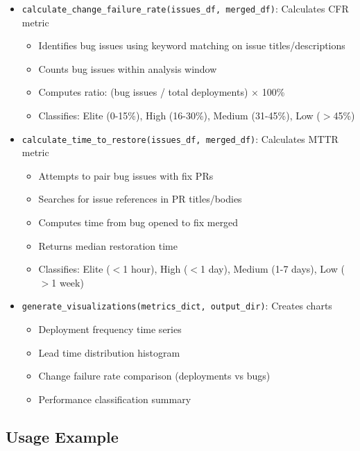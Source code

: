 \begin{itemize}
    \item \texttt{calculate\_change\_failure\_rate(issues\_df, merged\_df)}: Calculates CFR metric
    \begin{itemize}
        \item Identifies bug issues using keyword matching on issue titles/descriptions
        \item Counts bug issues within analysis window
        \item Computes ratio: (bug issues / total deployments) $\times$ 100\%
        \item Classifies: Elite (0-15\%), High (16-30\%), Medium (31-45\%), Low ($>$45\%)
    \end{itemize}

    \item \texttt{calculate\_time\_to\_restore(issues\_df, merged\_df)}: Calculates MTTR metric
    \begin{itemize}
        \item Attempts to pair bug issues with fix PRs
        \item Searches for issue references in PR titles/bodies
        \item Computes time from bug opened to fix merged
        \item Returns median restoration time
        \item Classifies: Elite ($<$1 hour), High ($<$1 day), Medium (1-7 days), Low ($>$1 week)
    \end{itemize}

    \item \texttt{generate\_visualizations(metrics\_dict, output\_dir)}: Creates charts
    \begin{itemize}
        \item Deployment frequency time series
        \item Lead time distribution histogram
        \item Change failure rate comparison (deployments vs bugs)
        \item Performance classification summary
    \end{itemize}
\end{itemize}

\subsection{Usage Example}

